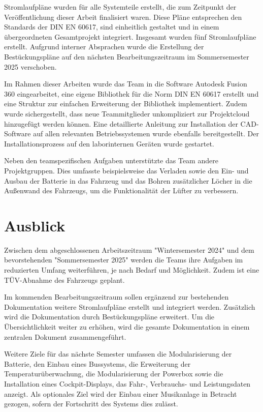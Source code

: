 Stromlaufpläne wurden für alle Systemteile erstellt, die zum Zeitpunkt der Veröffentlichung dieser Arbeit finalisiert waren. Diese Pläne entsprechen den Standards der DIN EN 60617, sind einheitlich gestaltet und in einem übergeordneten Gesamtprojekt integriert. Insgesamt wurden fünf Stromlaufpläne erstellt. Aufgrund interner Absprachen wurde die Erstellung der Bestückungspläne auf den nächsten Bearbeitungszeitraum im Sommersemester 2025 verschoben.  

Im Rahmen dieser Arbeiten wurde das Team in die Software Autodesk Fusion 360 eingearbeitet, eine eigene Bibliothek für die Norm DIN EN 60617 erstellt und eine Struktur zur einfachen Erweiterung der Bibliothek implementiert. Zudem wurde sichergestellt, dass neue Teammitglieder unkompliziert zur Projektcloud hinzugefügt werden können. Eine detaillierte Anleitung zur Installation der CAD-Software auf allen relevanten Betriebssystemen wurde ebenfalls bereitgestellt. Der Installationsprozess auf den laborinternen Geräten wurde gestartet.  

Neben den teamspezifischen Aufgaben unterstützte das Team andere Projektgruppen. Dies umfasste beispielsweise das Verladen sowie den Ein- und Ausbau der Batterie in das Fahrzeug und das Bohren zusätzlicher Löcher in die Außenwand des Fahrzeugs, um die Funktionalität der Lüfter zu verbessern.

\section*{Ausblick}
Zwischen dem abgeschlossenen Arbeitszeitraum "Wintersemester 2024" und dem bevorstehenden "Sommersemester 2025" werden die Teams ihre Aufgaben im reduzierten Umfang weiterführen, je nach Bedarf und Möglichkeit. Zudem ist eine TÜV-Abnahme des Fahrzeugs geplant.  

Im kommenden Bearbeitungszeitraum sollen ergänzend zur bestehenden Dokumentation weitere Stromlaufpläne erstellt und integriert werden. Zusätzlich wird die Dokumentation durch Bestückungspläne erweitert. Um die Übersichtlichkeit weiter zu erhöhen, wird die gesamte Dokumentation in einem zentralen Dokument zusammengeführt.  

Weitere Ziele für das nächste Semester umfassen die Modularisierung der Batterie, den Einbau eines Bussystems, die Erweiterung der Temperaturüberwachung, die Modularisierung der Powerbox sowie die Installation eines Cockpit-Displays, das Fahr-, Verbrauchs- und Leistungsdaten anzeigt. Als optionales Ziel wird der Einbau einer Musikanlage in Betracht gezogen, sofern der Fortschritt des Systems dies zulässt.